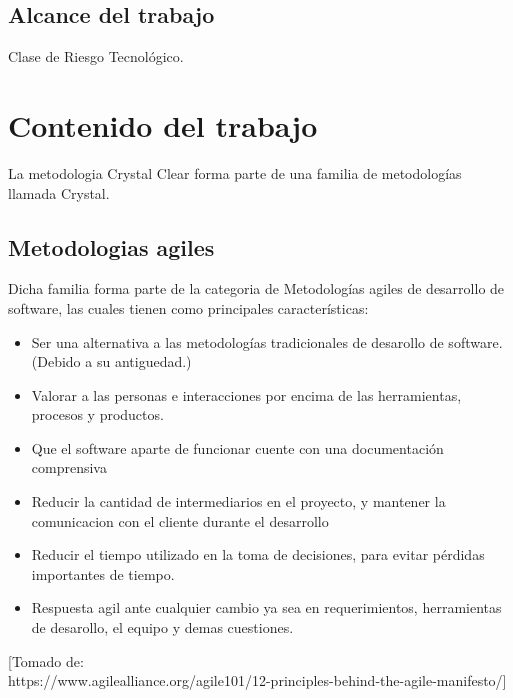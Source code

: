 \documentclass[12pt,a4paper]{article}
\begin{document}
	\subsection{Alcance del trabajo}
	Clase de Riesgo Tecnol\'ogico.
	\pagebreak
	
	\section{Contenido del trabajo}
	La metodologia Crystal Clear forma parte de una familia de metodologías llamada Crystal.
	
	\subsection*{Metodologias agiles}
	Dicha familia forma parte de la categoria de Metodologías agiles de desarrollo de software, las cuales tienen como principales características:
	\begin{itemize}
		\item Ser una alternativa a las metodologías tradicionales de desarollo de software.\\
		(Debido a su antiguedad.)
		
		\item Valorar a las personas e interacciones por encima de las herramientas, procesos y productos.
		
		\item Que el software aparte de funcionar cuente con una documentación comprensiva
		
		\item Reducir la cantidad de intermediarios en el proyecto, y mantener la comunicacion con el cliente durante el desarrollo
		
		\item Reducir el tiempo utilizado en la toma de decisiones, para evitar pérdidas importantes de tiempo.
		
		\item Respuesta agil ante cualquier cambio ya sea en requerimientos, herramientas de desarollo, el equipo y demas cuestiones.
		\\
	\end{itemize}
	[Tomado de:\\
	https://www.agilealliance.org/agile101/12-principles-behind-the-agile-manifesto/]\\
	
\end{document}
